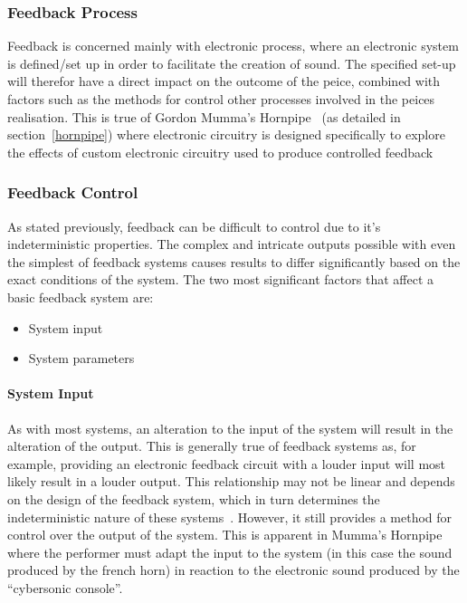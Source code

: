 \documentclass[titlepage]{scrartcl}
\begin{document}
    \subsubsection{Feedback Process}
    Feedback is concerned mainly with electronic process, where an electronic
    system is defined/set up in order to facilitate the creation of sound. The
    specified set-up will therefor have a direct impact on the outcome of the
    peice, combined with factors such as the methods for control other
    processes involved in the peices realisation. This is true of Gordon
    Mumma's Hornpipe~\citeyearpar{mumma2002lem} (as detailed in
    section~\ref{hornpipe}) where electronic circuitry is designed specifically
    to explore the effects of custom electronic circuitry used to produce
    controlled feedback~\parencite[p.8, 390]{nyman1999em}\\

    \subsubsection{Feedback Control}
    As stated previously, feedback can be difficult to control due to it's
    indeterministic properties. The complex and intricate outputs possible with
    even the simplest of feedback systems causes results to differ
    significantly based on the exact conditions of the system. The two most
    significant factors that affect a basic feedback system are:
    \begin{itemize}
        \item System input
        \item System parameters
    \end{itemize}

    \paragraph{System Input} As with most systems, an alteration to the input
    of the system will result in the alteration of the output. This is
    generally true of feedback systems as, for example, providing an electronic
    feedback circuit with a louder input will most likely result in a louder
    output. This relationship may not be linear and depends on the design of
    the feedback system, which in turn determines the indeterministic nature of
    these systems~\parencite[p.19-27]{weisert2010ioi}. However, it still
    provides a method for control over the output of the system. This is
    apparent in Mumma's Hornpipe~\citeyearpar{mumma2002lem} where the performer
    must adapt the input to the system (in this case the sound produced by the
    french horn) in reaction to the electronic sound produced by the
    ``cybersonic console''.
    
\end{document}
